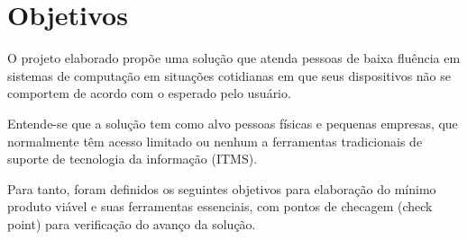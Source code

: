 \documentclass[
    12pt,               %
    openright,          %
    oneside,
    a4paper,            %
    MODELO,             %
    english,            %
    brazil              %
   ]{ifsp-spo-inf-ctds}
\begin{document}
\begin{comment}
Nesse momento, o desenvolvimento de uma solução que popule e atualize a seção de perguntas frequentes e o chat automatizado é prioridade de desenvolvimento e será o principal indicador de viabilidade.

\chapter{Tecnologias}

\section{Modelo de trabalho}

Scrum + kanban, com iterações por diárias	.

\section{Infra estrutura}

A definir

\section{Back end}

A definir

\section{Front end}

A definir

\end{comment}

\chapter{Objetivos}

O projeto elaborado propõe uma solução que atenda pessoas de baixa fluência em sistemas de computação em situações cotidianas em que seus dispositivos não se comportem de acordo com o esperado pelo usuário.

Entende-se que a solução tem como alvo pessoas físicas e pequenas empresas, que normalmente têm acesso limitado ou nenhum a ferramentas tradicionais de suporte de tecnologia da informação (ITMS).

Para tanto, foram definidos os seguintes objetivos para elaboração do mínimo produto viável e suas ferramentas essenciais, com pontos de checagem (check point) para verificação do avanço da solução.
\end{document}
